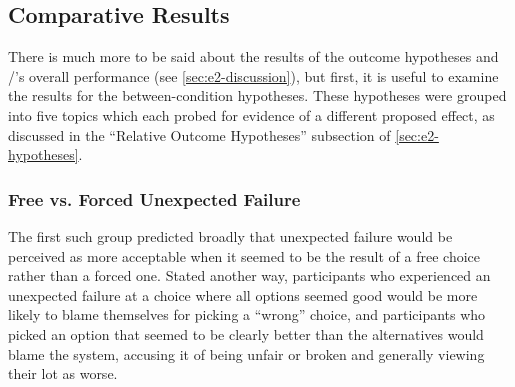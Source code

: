 \subsection{Comparative Results}

There is much more to be said about the results of the outcome hypotheses and \dunyazad/'s overall performance (see \cref{sec:e2-discussion}), but first, it is useful to examine the results for the between-condition hypotheses.
%
These hypotheses were grouped into five topics which each probed for evidence of a different proposed effect, as discussed in the ``Relative Outcome Hypotheses'' subsection of \cref{sec:e2-hypotheses}.

\subsubsection{Free vs\@. Forced Unexpected Failure}

The first such group predicted broadly that unexpected failure would be perceived as more acceptable when it seemed to be the result of a free choice rather than a forced one.
%
Stated another way, participants who experienced an unexpected failure at a choice where all options seemed good would be more likely to blame themselves for picking a ``wrong'' choice, and participants who picked an option that seemed to be clearly better than the alternatives would blame the system, accusing it of being unfair or broken and generally viewing their lot as worse.

\begin{table}[!p]
\centering
\bgroup
\def\arraystretch{1.3}
\setlength{\tabcolsep}{0.6em}
 \\[3ex]

\egroup
\caption[Retrospective free vs\@. forced failure results]{%
Retrospective hypotheses for the claim that ``Unexpected failure is more acceptable when it happens at a freely-chosen option than when the player feels there are no viable alternative options.''
%
The bottom half shows the results when choice 8638 is allowed to stand in for the entire \obvfm{} case.
%
Each line lists the hypothesis, the $p$-value, and if significant ($p < 0.05$), the common-language effect size.
%
Low-confidence hypotheses are marked with a `\lc/'.
%
Note that each pair of rows contains opposing predictions, because complementary questions are arranged together.}
  \label{tab:e2-free-vs-forced-failure-results}
\end{table}


